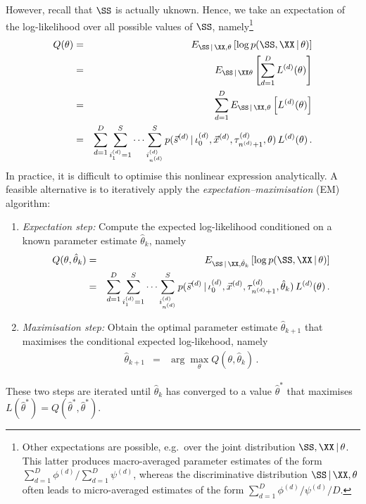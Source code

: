 \documentclass[a4paper]{article}
\begin{document}
However, recall that $\SS$ is actually uknown. Hence, we take an expectation of the log-likelihood over all possible values of
$\SS$, namely\footnote{Other expectations are possible, e.g.\ over the joint distribution $\SS,\XX\,|\,\theta$. This latter produces macro-averaged
parameter estimates of the form $\sum_{d=1}^D\phi^{(d)}/\sum_{d=1}^D\psi^{(d)}$, whereas the discriminative distribution $\SS\,|\,\XX,\theta$
often leads to micro-averaged estimates of the form $\sum_{d=1}^D\phi^{(d)}/\psi^{(d)}/D$.}
\begin{eqnarray}
  Q(\theta) & = & E_{\SS\,|\,\XX,\theta}\left[\log p(\SS,\XX\,|\,\theta)\right]
\nonumber\\& = & 
E_{\SS\,|\,\XX\theta}\left[
\sum_{d=1}^D L^{(d)}(\theta)
\right]
\nonumber\\& = & 
\sum_{d=1}^D E_{\SS\,|\,\XX,\theta}\left[
L^{(d)}(\theta)
\right]
\nonumber\\& = & 
\sum_{d=1}^D \sum_{i_1^{(d)}=1}^{S}\cdots\sum_{i^{(d)}_{n^{(d)}}}^{S}
p(\vec{s}^{(d)}\,|\,\iota_0^{(d)},\vec{x}^{(d)},\tau_{n^{(d)}+1}^{(d)},\theta) 
\,L^{(d)}(\theta)
\,.
\end{eqnarray}
In practice, it is difficult to optimise this nonlinear expression analytically. A feasible alternative is to iteratively apply the {\em expectation--maximisation}
(EM) algorithm:
\begin{enumerate}
\item {\em Expectation step:} Compute the expected log-likelihood conditioned on a known parameter estimate $\hat{\theta}_k$,
namely
\begin{eqnarray}
  Q(\theta,\hat{\theta}_k) & = & E_{\SS\,|\,\XX,\hat{\theta}_k}\left[\log p(\SS,\XX\,|\,\theta)\right]
\nonumber\\& = &
\sum_{d=1}^D \sum_{i_1^{(d)}=1}^{S}\cdots\sum_{i^{(d)}_{n^{(d)}}}^{S} 
p(\vec{s}^{(d)}\,|\,\iota_0^{(d)},\vec{x}^{(d)},\tau_{n^{(d)}+1}^{(d)},\hat{\theta}_k)
\,L^{(d)}(\theta)\,.
\end{eqnarray}

\item {\em Maximisation step:} Obtain the optimal parameter estimate $\hat{\theta}_{k+1}$ that maximises the
conditional expected log-likehood, namely
\begin{eqnarray}
\hat{\theta}_{k+1} & = & \arg\max_{\theta} Q(\theta,\hat{\theta}_k)\,.
\end{eqnarray}
\end{enumerate}
These two steps are iterated until $\hat{\theta}_k$ has converged to a value $\hat{\theta}^*$ that maximises 
$L(\hat{\theta}^*)=Q(\hat{\theta}^*,\hat{\theta}^*)$.
\end{document}
